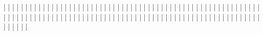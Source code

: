 |                                       |
|                                       |
|                                       |
|                                       |
|                                       |
|                                       |
|                                       |
|                                       |
|                                       |
|                                       |
|                                       |
|                                       |
|                                       |
|                                       |
|                                       |
|                                       |
|                                       |
|                                       |
|                                       |
|                                       |
|                                       |
|                                       |
|                                       |
|                                       |
|                                       |
|                                       |
|                                       |
|                                       |
|                                       |
|                                       |
|                                       |
|                                       |
|                                       |
|                                       |
|                                       |
|                                       |
|                                       |
|                                       |
|                                       |
|                                       |
|                                       |
|                                       |
|                                       |
|                                       |
|                                       |
|                                       |
|                                       |
|                                       |
|                                       |
|                                       |
|                                       |
|                                       |
|                                       |
|                                       |
|                                       |
|                                       |
|                                       |
|                                       |
|                                       |
|                                       |
|                                       |
|                                       |
